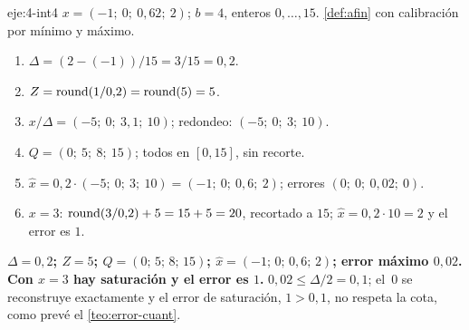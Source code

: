 \begin{solucion}{eje:4-int4}
\datos $x=(-1;\allowbreak\ 0;\allowbreak\ 0{,}62;\allowbreak\ 2)$; $b=4$, enteros $0,\dots,15$.
\planteamiento \cref{def:afin} con calibración por mínimo y máximo.
\pasos
\begin{enumerate}[label=\arabic*.]
  \item $\Delta=(2-(-1))/15=3/15=0{,}2$.
  \item $Z=\operatorname{round}(1/0{,}2)=\operatorname{round}(5)=5$.
  \item $x/\Delta=(-5;\allowbreak\ 0;\allowbreak\ 3{,}1;\allowbreak\ 10)$; redondeo: $(-5;\allowbreak\ 0;\allowbreak\ 3;\allowbreak\ 10)$.
  \item $Q=(0;\allowbreak\ 5;\allowbreak\ 8;\allowbreak\ 15)$; todos en $[0,15]$, sin recorte.
  \item $\hat x=0{,}2\cdot(-5;\allowbreak\ 0;\allowbreak\ 3;\allowbreak\ 10)=(-1;\allowbreak\ 0;\allowbreak\ 0{,}6;\allowbreak\ 2)$; errores $(0;\allowbreak\ 0;\allowbreak\ 0{,}02;\allowbreak\ 0)$.
  \item $x=3$: $\operatorname{round}(3/0{,}2)+5=15+5=20$, recortado a $15$; $\hat x=0{,}2\cdot 10=2$ y el error es $1$.
\end{enumerate}
\resultado \textbf{$\Delta=0{,}2$; $Z=5$; $Q=(0;\allowbreak\,5;\allowbreak\,8;\allowbreak\,15)$; $\hat x=(-1;\allowbreak\,0;\allowbreak\,0{,}6;\allowbreak\,2)$; error máximo $0{,}02$. Con $x=3$ hay saturación y el error es $1$.}
\comprobacion $0{,}02\le\Delta/2=0{,}1$; el~0 se reconstruye exactamente y el error de saturación, $1>0{,}1$, no respeta la cota, como prevé el \cref{teo:error-cuant}.
\end{solucion}

